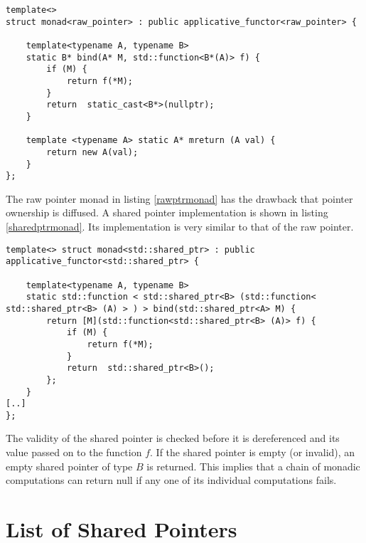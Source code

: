 \documentclass[12pt,fleqn]{article}
\begin{document}
%
%

\begin{minipage}{\linewidth}
\begin{lstlisting}[caption=monad implemention for a raw pointer, label=rawptrmonad]
template<> 
struct monad<raw_pointer> : public applicative_functor<raw_pointer> {
	
	template<typename A, typename B>
	static B* bind(A* M, std::function<B*(A)> f) {
		if (M) {
			return f(*M);
		}
		return  static_cast<B*>(nullptr);
	}
	
	template <typename A> static A* mreturn (A val) {
		return new A(val);
	}
};
\end{lstlisting}
\end{minipage}
%
%

The raw pointer monad in listing \ref{rawptrmonad} has the drawback that pointer ownership is diffused.
A shared pointer implementation is shown in listing \ref{sharedptrmonad}.
Its implementation is very similar to that of the raw pointer.

%
%
\begin{minipage}{\linewidth}
\begin{lstlisting}[caption=monad implemention for std::shared\_ptr, label=sharedptrmonad]
template<> struct monad<std::shared_ptr> : public applicative_functor<std::shared_ptr> {

	template<typename A, typename B>
	static std::function < std::shared_ptr<B> (std::function< std::shared_ptr<B> (A) > ) > bind(std::shared_ptr<A> M) {
		return [M](std::function<std::shared_ptr<B> (A)> f) {
			if (M) {
				return f(*M);
			}
			return  std::shared_ptr<B>();
		};
	}
[..]
};
\end{lstlisting}
\end{minipage}
%
%
%

The validity of the shared pointer is checked before it is dereferenced and its value passed on to the function $f$.
If the shared pointer is empty (or invalid), an empty shared pointer of type $B$ is returned.
This implies that a chain of monadic computations can return null if any one of its individual computations fails.


%
\section{List of Shared Pointers}
%
%
%
\end{document}
